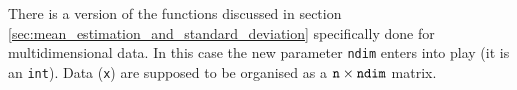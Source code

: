 \documentclass[11pt,a4paper,twoside]{article}
\begin{document}
There is a version of the functions discussed in section \ref{sec:mean_estimation_and_standard_deviation} specifically done for multidimensional data.
In this case the new parameter \verb+ndim+ enters into play (it is an \verb+int+).
Data (\verb+x+) are supposed to be organised as a $\verb+n+ \times \verb+ndim+$ matrix.



\printindex
\end{document}
